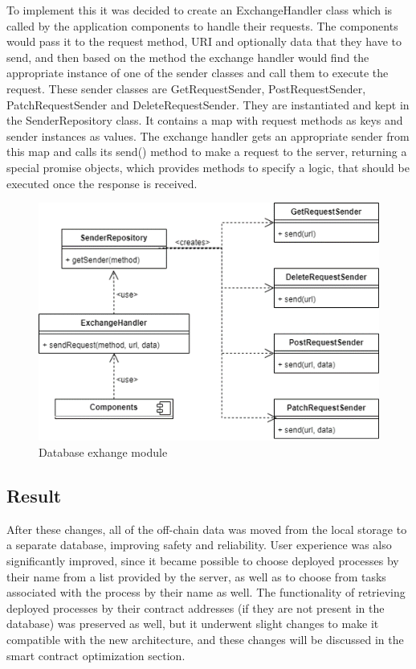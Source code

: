 To implement this it was decided to create an ExchangeHandler class which is called by the application components to handle their requests. The components would pass it to the request method, URI and optionally data that they have to send, and then based on the method the exchange handler would find the appropriate instance of one of the sender classes and call them to execute the request. These sender classes are GetRequestSender, PostRequestSender, PatchRequestSender and DeleteRequestSender. They are instantiated and kept in the SenderRepository class. It contains a map with request methods as keys and sender instances as values. The exchange handler gets an appropriate sender from this map and calls its send() method to make a request to the server, returning a special promise objects, which provides methods to specify a logic, that should be executed once the response is received.


\begin{figure}[hbt]
	\includegraphics[width=\textwidth]{gfx/persistence_exchange}
	\caption{Database exhange module}
	\label{fig:impr:persistence:exchange}
\end{figure}

\subsection{Result}
\label{sec:impr:persistence:result}

After these changes, all of the off-chain data was moved from the local storage to a separate database, improving safety and reliability. User experience was also significantly improved, since it became possible to choose deployed processes by their name from a list provided by the server, as well as to choose from tasks associated with the process by their name as well. The functionality of retrieving deployed processes by their contract addresses (if they are not present in the database) was preserved as well, but it underwent slight changes to make it compatible with the new architecture, and these changes will be discussed in the smart contract optimization section.

